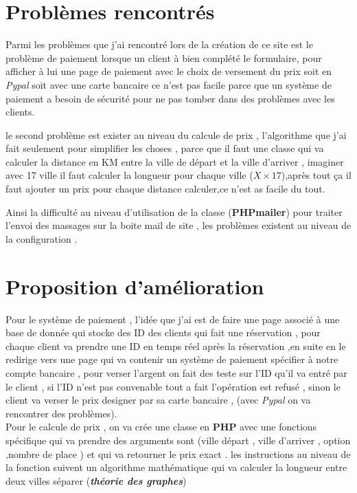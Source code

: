 \documentclass[a4paper,12pt]{report}
\begin{document}
\section{Problèmes rencontrés}
\begin{tcolorbox}
Parmi les problèmes que j'ai rencontré lors de la création de ce site est le problème de paiement lorsque un client à bien complété le formulaire, pour afficher à lui une page de paiement avec le choix de versement du prix soit en \textit{Pypal} soit avec une carte bancaire ce n'est pas facile parce que un système de paiement a besoin de sécurité pour ne pas tomber dans des problèmes avec les clients.
\end{tcolorbox}
\begin{tcolorbox}
le second problème est exister au niveau du calcule de prix , l'algorithme que j'ai fait seulement pour simplifier les choses , parce que il faut une classe qui va calculer la distance en KM entre la ville de départ et la ville d'arriver , imaginer avec 17 ville il faut calculer la longueur pour chaque ville ($X \times 17$),après tout ça il faut ajouter un prix pour chaque distance calculer,ce n'est as facile du tout.
\end{tcolorbox}
\begin{tcolorbox}
Ainsi la difficulté au niveau d'utilisation de la classe (\textbf{PHPmailer}) pour  traiter l'envoi des massages sur la boite mail de site , les problèmes existent au niveau de la configuration .
\end{tcolorbox}
\section{Proposition d'amélioration}
Pour le système de paiement , l'idée que j'ai est de faire une page associé à une base de donnée qui stocke des ID des clients qui fait une réservation , pour chaque client va prendre une ID en temps réel après la réservation ,en suite en le redirige vers une page qui va contenir un système de paiement spécifier à notre compte bancaire , pour verser l'argent on fait des teste sur l'ID qu'il va entré par le client , si l'ID n'est pas convenable tout a fait l'opération est refusé , sinon le client va verser le prix designer par sa carte bancaire , (avec \textit{Pypal} on va rencontrer des problèmes).
\\
Pour le calcule de prix , on va crée une classe en \textbf{PHP} avec une fonctions spécifique qui va prendre des arguments sont (ville départ , ville d'arriver , option ,nombre de place ) et qui va retourner le prix exact . les instructions au niveau de la fonction suivent un algorithme mathématique qui va calculer la longueur entre deux villes séparer (\textbf{\textit{théorie des graphes}}) 
\end{document}
